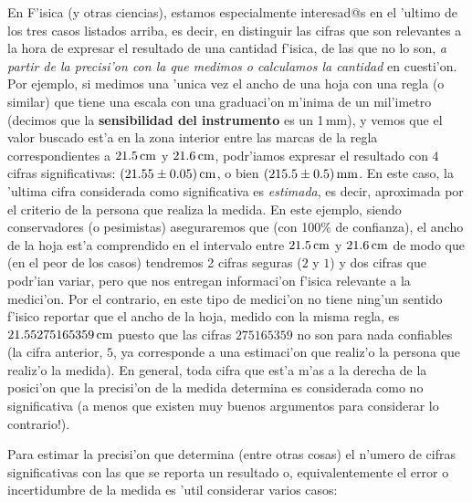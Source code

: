 \documentclass[a4paper]{report}
\begin{document}
En F'isica (y otras ciencias), estamos especialmente interesad@s en el 'ultimo de los tres casos listados arriba, es decir, en distinguir las cifras que son relevantes a la hora de expresar el resultado de una cantidad f'isica, de las que no lo son, \textit{a partir de la precisi'on con la que medimos o calculamos la cantidad} en cuesti'on. Por ejemplo, si medimos una 'unica vez el ancho de una hoja con una regla (o similar) que tiene una escala con una graduaci'on m'inima de un mil'imetro (decimos que la \textbf{sensibilidad del instrumento} es un 1\,mm), y vemos que el valor buscado est'a en la zona interior entre las marcas de la regla correspondientes a $21.5\,\rm cm$ y $21.6\,\rm cm$, podr'iamos expresar el resultado con 4 cifras significativas: $(21.55\pm 0.05)\,\rm cm$, o bien $(215.5\pm 0.5)\,\rm mm$. En este caso, la 'ultima cifra considerada como significativa es \textit{estimada}, es decir, aproximada por el criterio de la persona que realiza la medida. En este ejemplo, siendo conservadores (o pesimistas) aseguraremos que (con 100\% de confianza), el ancho de la hoja est'a comprendido en el intervalo entre $21.5\,\rm cm$ y $21.6\,\rm cm$ de modo que (en el peor de los casos) tendremos 2 cifras seguras ($2$ y $1$) y dos cifras que podr'ian variar, pero que nos entregan informaci'on f'isica relevante a la medici'on. Por el contrario, en este tipo de medici'on no tiene ning'un sentido f'isico reportar que el ancho de la hoja, medido con la misma regla, es $21.55275165359\,\rm cm$ puesto que las cifras $275165359$ no son para nada confiables (la cifra anterior, $5$, ya corresponde a una estimaci'on que realiz'o la persona que realiz'o la medida). En general, toda cifra que est'a m'as a la derecha de la posici'on que la precisi'on de la medida determina es considerada como no significativa (a menos que existen muy buenos argumentos para considerar lo contrario!).

Para estimar la precisi'on que determina (entre otras cosas) el n'umero de cifras significativas con las que se reporta un resultado o, equivalentemente el error o incertidumbre de la medida es 'util considerar varios casos:
\end{document}
